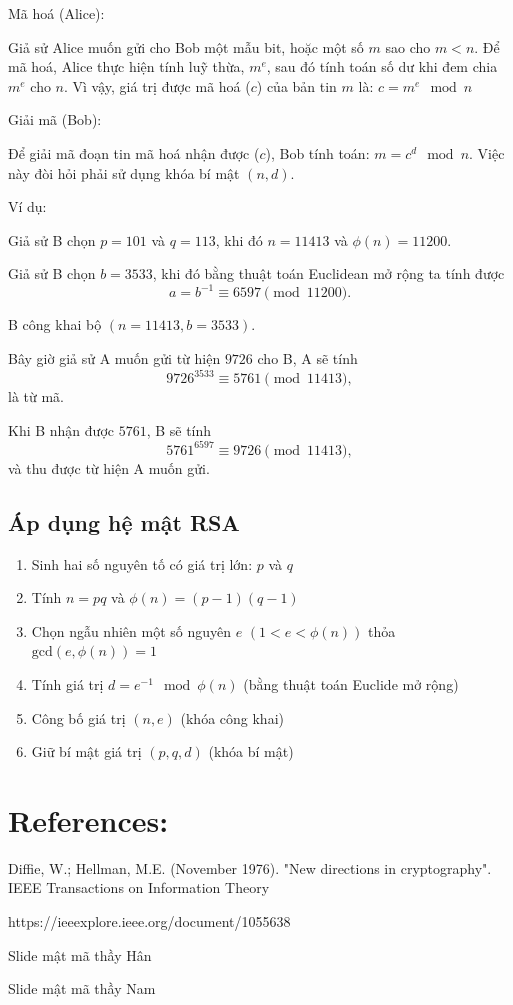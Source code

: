 \documentclass{article}
\begin{document}
Mã hoá (Alice):

Giả sử Alice muốn gửi cho Bob một mẫu bit, hoặc một số $m$ sao cho $m < n$. Để mã hoá, Alice thực hiện tính luỹ thừa, $m^e$, sau đó tính toán số dư khi đem chia $m^e$ cho $n$. Vì vậy, giá trị được mã hoá ($c$) của bản tin $m$ là: $c = m^e \mod n $

Giải mã (Bob):

Để giải mã đoạn tin mã hoá nhận được ($c$), Bob tính toán: $ m = c^d \mod n $. Việc này đòi hỏi phải sử dụng khóa bí mật $(n, d)$.

Ví dụ:

Giả sử B chọn $p = 101$ và $q = 113$, khi đó $n = 11413$ và $\phi(n) = 11200$.

Giả sử B chọn $b = 3533$, khi đó bằng thuật toán Euclidean mở rộng ta tính được
\[a = b^{-1} \equiv 6597 \pmod{11200}.\]

B công khai bộ $(n = 11413, b = 3533)$.

Bây giờ giả sử A muốn gửi từ hiện $9726$ cho B, A sẽ tính
\[9726^{3533} \equiv 5761 \pmod{11413}, \]
là từ mã.

Khi B nhận được $5761$, B sẽ tính
\[5761^{6597} \equiv 9726 \pmod{11413}, \]
và thu được từ hiện A muốn gửi.

\subsection{Áp dụng hệ mật RSA}

\begin{enumerate}
\item Sinh hai số nguyên tố có giá trị lớn: $p$ và $q$
\item Tính $n = pq$ và $\phi(n) = (p - 1)(q - 1)$
\item Chọn ngẫu nhiên một số nguyên $e$ $(1 < e < \phi(n))$ thỏa $\text{gcd}(e, \phi(n)) = 1$
\item Tính giá trị $d = e^{-1} \mod \phi(n)$ (bằng thuật toán Euclide mở rộng)
\item Công bố giá trị $(n, e)$ (khóa công khai)
\item Giữ bí mật giá trị $(p, q, d)$ (khóa bí mật)
\end{enumerate}

\section*{References:}
Diffie, W.; Hellman, M.E. (November 1976). "New directions in cryptography". IEEE Transactions on Information Theory

https://ieeexplore.ieee.org/document/1055638

Slide mật mã thầy Hân

Slide mật mã thầy Nam
\end{document}
